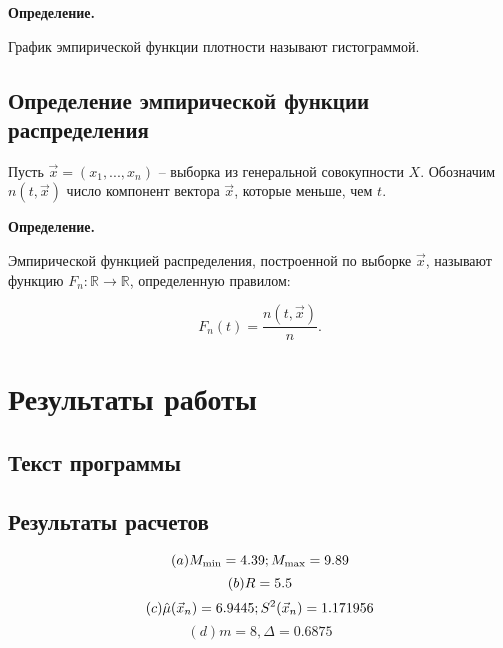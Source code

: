 \textbf{Определение.}

График эмпирической функции плотности называют гистограммой.


\section{Определение эмпирической функции распределения}

Пусть $\vec x = (x_1, ..., x_n)$ -- выборка из генеральной совокупности $X$. Обозначим $n(t, \vec x)$ число компонент вектора $\vec x$, которые меньше, чем $t$.

\textbf{Определение.}

Эмпирической функцией распределения, построенной по выборке $\vec x$, называют функцию $F_n: \mathbb{R} \to \mathbb{R}$, определенную правилом: 

\begin{equation*}
    F_n(t) = \frac{n(t, \vec x)}{n}.
\end{equation*}



\chapter{Результаты работы}

\section{Текст программы}




\section{Результаты расчетов}
\begin{equation*}
    (a) M_{\min} = 4.39;  M_{\max} = 9.89 \\
\end{equation*}
\begin{equation*}
    (b) R = 5.5 \\
\end{equation*}
\begin{equation*}
    (c) \hat\mu(\vec x_n) = 6.9445; S^2(\vec x_n) = 1.171956 \\
\end{equation*}
\begin{equation*}
    (d) m = 8, \Delta = 0.6875
\end{equation*}





